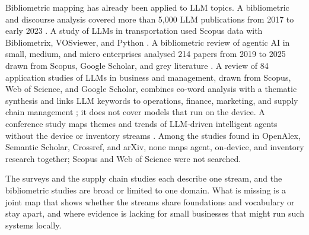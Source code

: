 Bibliometric mapping has already been applied to LLM topics. A bibliometric and discourse analysis covered more than 5,000 LLM publications from 2017 to early 2023 \parencite{fan2024}. A study of LLMs in transportation used Scopus data with Bibliometrix, VOSviewer, and Python \parencite{hassan2025}. A bibliometric review of agentic AI in small, medium, and micro enterprises analysed 214 papers from 2019 to 2025 drawn from Scopus, Google Scholar, and grey literature \parencite{olujimi2025}. A review of 84 application studies of LLMs in business and management, drawn from Scopus, Web of Science, and Google Scholar, combines co-word analysis with a thematic synthesis and links LLM keywords to operations, finance, marketing, and supply chain management \parencite{arslan2026}; it does not cover models that run on the device. A conference study maps themes and trends of LLM-driven intelligent agents without the device or inventory streams \parencite{li2025agents}. Among the studies found in OpenAlex, Semantic Scholar, Crossref, and arXiv, none maps agent, on-device, and inventory research together; Scopus and Web of Science were not searched.

The surveys and the supply chain studies each describe one stream, and the bibliometric studies are broad or limited to one domain. What is missing is a joint map that shows whether the streams share foundations and vocabulary or stay apart, and where evidence is lacking for small businesses that might run such systems locally.
